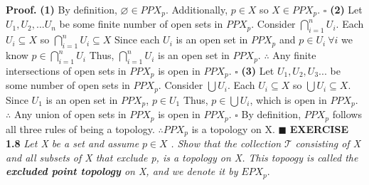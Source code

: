 \documentclass[12pt]{article}
\begin{document}
	\textbf{Proof. } \newline
	\textbf{(1)} By definition, \(\varnothing \in PPX_p\). \newline
	Additionally, \(p \in X\) so \(X \in PPX_p\).
	\newline \(\square\) \newline \newline
	\textbf{(2)} Let \(U_1,U_2,...U_n\) be some finite number of open sets in \(PPX_p\). \newline
	Consider \(\bigcap_{i=1}^n U_i\). \newline \newline
	Each \(U_i \subseteq X\) so \(\bigcap_{i=1}^n U_i \subseteq X\) \newline
	Since each \(U_i\) is an open set in \(PPX_p\) and \(p \in U_i\  \forall i\) we know \(p \in \bigcap_{i=1}^n U_i\)
	Thus, \(\bigcap_{i=1}^n U_i\) is an open set in \(PPX_p\).
	\newline \(\therefore \) Any finite intersections of open sets in \(PPX_p\) is open in \(PPX_p\).
	\newline \(\square\) \newline \newline
	\textbf{(3)} Let \(U_1, U_2,U_3...\) be some number of open sets in \(PPX_p\). \newline
	Consider \(\bigcup U_i\). \newline \newline
	Each \(U_i \subseteq X\) so \(\bigcup U_i \subseteq X\). \newline
	Since \(U_1\) is an open set in \(PPX_p\), \(p \in U_1\)
	\newline
	Thus, \(p \in \bigcup U_i\), which is open in \(PPX_p\). \newline
	\(\therefore\) Any union of open sets in \(PPX_p\) is open in \(PPX_p\).
	\newline \(\square\) \newline
	By definition, \(PPX_p\) follows all three rules of being a topology. \newline \(\therefore PPX_p\) is a topology on X.
	\newline \(\blacksquare\) \newpage
	\noindent
	\textbf{EXERCISE 1.8} \textit{Let X be a set and assume }\(p\in X\)
	\textit{. Show that the collection} \(\mathcal{T}\) \textit{consisting of X and all subsets of X that exclude p,
	is a topology on X. This topoogy is called the \textbf{excluded point topology} on X, and we denote it by} \(EPX_p\).
	\newline \newline
\end{document}
